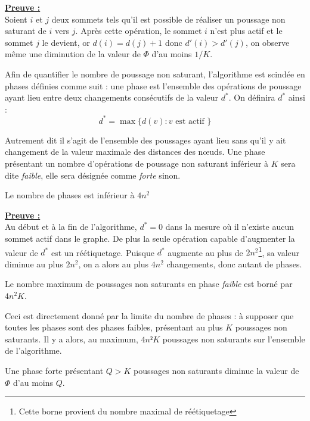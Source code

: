 \underline{\textbf{Preuve :}}\\
Soient $i$ et $j$ deux sommets tels qu'il est possible de réaliser un poussage non saturant de $i$
vers $j$.  Après cette opération, le sommet $i$ n'est plus actif et le sommet $j$ le devient, or
$d(i) = d(j) + 1$ donc $d'(i) > d'(j)$, on observe même une diminution de la valeur de $\Phi$ d'au
moins $1/K$.

Afin de quantifier le nombre de poussage non saturant, l'algorithme est scindée en phases définies
comme suit : une phase est l'ensemble des opérations de poussage ayant lieu entre deux changements
consécutifs de la valeur $d^*$. On définira $d^*$ ainsi :
\begin{equation}
	d^* = \max\{d(v) : v \mbox{ est actif }\}
\end{equation}

Autrement dit il s'agit de l'ensemble des poussages ayant lieu sans qu'il y ait changement de la
valeur maximale des distances des n\oe uds.
Une phase présentant un nombre d'opérations de poussage non saturant inférieur à $K$ sera dite
\emph{faible}, elle sera désignée comme \emph{forte} sinon.

\begin{lemma}
	Le nombre de phases est inférieur à $4n^2$
\end{lemma}

\underline{\textbf{Preuve :}}\\
Au début et à la fin de l'algorithme, $d^* = 0$ dans la mesure où il n'existe aucun sommet actif
dans le graphe. De plus la seule opération capable d'augmenter la valeur de $d^*$ est un
réétiquetage. Puisque $d^*$ augmente au plus de $2n^2$\footnote{Cette borne provient du nombre maximal
de réétiquetage}, sa valeur diminue au plus $2n^2$, on a alors au plus $4n^2$ changements, donc
autant de phases.

\begin{corol}
	Le nombre maximum de poussages non saturants en phase \emph{faible} est borné par $4n^2K$.
\end{corol}

Ceci est directement donné par la limite du nombre de phases : à supposer que toutes les phases
sont des phases faibles, présentant au plus $K$ poussages non saturants. Il y a alors, au maximum,
$4n²K$ poussages non saturants sur l'ensemble de l'algorithme.

\begin{lemma}
	Une phase forte présentant $Q>K$ poussages non saturants diminue la valeur de $\Phi$ d'au moins
	$Q$.
\end{lemma}

